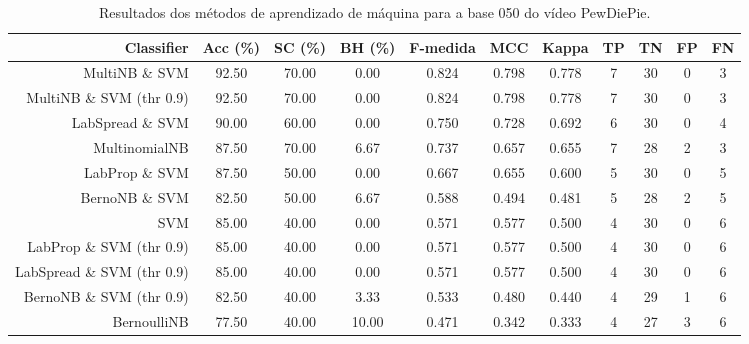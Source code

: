 \begin{table}[!htb]
\centering
\caption{Resultados dos métodos de aprendizado de máquina para a base 050 do vídeo PewDiePie.}
\label{tab:PewDiePie-050}
\begin{tabular}{r|c|c|c|c|c|c|c|c|c|c}
\hline\hline
Classifier & Acc (\%) & SC (\%) & BH (\%) & F-medida & MCC & Kappa & TP & TN & FP & FN \\ \hline
MultiNB \& SVM & 92.50 & 70.00 & 0.00 & 0.824 & 0.798 & 0.778 & 7 & 30 & 0 & 3 \\ 
MultiNB \& SVM (thr 0.9) & 92.50 & 70.00 & 0.00 & 0.824 & 0.798 & 0.778 & 7 & 30 & 0 & 3 \\ 
LabSpread \& SVM & 90.00 & 60.00 & 0.00 & 0.750 & 0.728 & 0.692 & 6 & 30 & 0 & 4 \\ 
MultinomialNB & 87.50 & 70.00 & 6.67 & 0.737 & 0.657 & 0.655 & 7 & 28 & 2 & 3 \\ 
LabProp \& SVM & 87.50 & 50.00 & 0.00 & 0.667 & 0.655 & 0.600 & 5 & 30 & 0 & 5 \\ 
BernoNB \& SVM & 82.50 & 50.00 & 6.67 & 0.588 & 0.494 & 0.481 & 5 & 28 & 2 & 5 \\ 
SVM & 85.00 & 40.00 & 0.00 & 0.571 & 0.577 & 0.500 & 4 & 30 & 0 & 6 \\ 
LabProp \& SVM (thr 0.9) & 85.00 & 40.00 & 0.00 & 0.571 & 0.577 & 0.500 & 4 & 30 & 0 & 6 \\ 
LabSpread \& SVM (thr 0.9) & 85.00 & 40.00 & 0.00 & 0.571 & 0.577 & 0.500 & 4 & 30 & 0 & 6 \\ 
BernoNB \& SVM (thr 0.9) & 82.50 & 40.00 & 3.33 & 0.533 & 0.480 & 0.440 & 4 & 29 & 1 & 6 \\ 
BernoulliNB & 77.50 & 40.00 & 10.00 & 0.471 & 0.342 & 0.333 & 4 & 27 & 3 & 6 \\ 
\hline\hline
\end{tabular}
\end{table}
